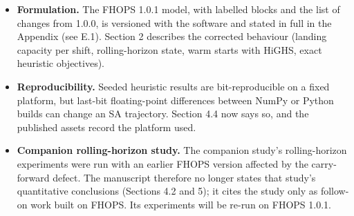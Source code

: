 \begin{itemize}
  The main conclusions of Section 3 hold: objective, production,
  runtime, and mobilisation rank the solvers differently on med42, so
  solver choice should follow planning priorities; tuning gains are
  scenario-dependent and do not beat the SA default on med42;
  disturbance sensitivity is small and scenario-dependent; and runtime
  increases with the number of blocks. We revised the interpretations
  that no longer held. med42 is no longer described as
  penalty-dominated, and the synthetic-small score is now explained as
  unmet volume rather than as a penalty for infeasible schedules. The
  small21 tuning gain is now described as a tie, and Section 3.1
  explains that Δ compares a short tuning run with a much longer SA
  default run. The caption of Table 4 now says that only synthetic-small
  has a negative objective, and the sign-convention note in Section 2
  now names the unmet-volume term.
\item
  \textbf{Formulation.} The FHOPS 1.0.1 model, with labelled blocks and
  the list of changes from 1.0.0, is versioned with the software and
  stated in full in the Appendix (see E.1). Section 2 describes the
  corrected behaviour (landing capacity per shift, rolling-horizon
  state, warm starts with HiGHS, exact heuristic objectives).
\item
  \textbf{Reproducibility.} Seeded heuristic results are
  bit-reproducible on a fixed platform, but last-bit floating-point
  differences between NumPy or Python builds can change an SA
  trajectory. Section 4.4 now says so, and the published assets record
  the platform used.
\item
  \textbf{Companion rolling-horizon study.} The companion study's
  rolling-horizon experiments were run with an earlier FHOPS version
  affected by the carry-forward defect. The manuscript therefore no
  longer states that study's quantitative conclusions (Sections 4.2 and
  5); it cites the study only as follow-on work built on FHOPS. Its
  experiments will be re-run on FHOPS 1.0.1.
\end{itemize}
